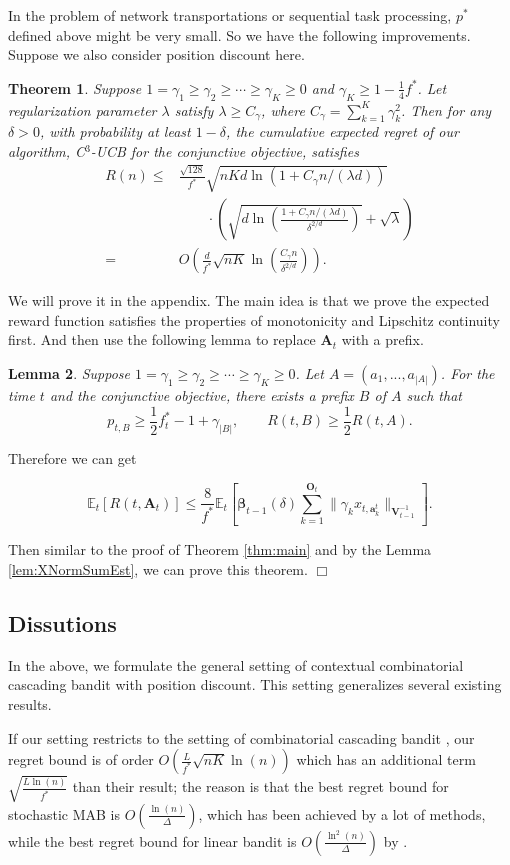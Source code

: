 \documentclass{article}
\newcommand{\bbeta}{\boldsymbol{\beta}}
\newcommand{\EE}{\mathbb{E}}
\newcommand{\bA}{\mathbf{A}}
\newcommand{\ba}{\mathbf{a}}
\newcommand{\bO}{\mathbf{O}}
\newcommand{\bV}{\mathbf{V}}
\newcommand{\abs}[1]{\left| #1 \right|}
\newcommand{\norm}[1]{\| #1 \|}
\newtheorem{theorem}{Theorem}[section]
\newtheorem{lemma}[theorem]{Lemma}%
\newenvironment{proof}{\noindent {\textbf{Proof. }}}{$\Box$ \medskip}
\newcommand{\CLemmaPrefixExi}{
	Suppose $1 = \gamma_1 \geq \gamma_2 \geq \cdots \geq \gamma_K \geq 0$. Let $A = (a_1, ..., a_{\abs{A}})$. For the time $t$ and the conjunctive objective, there exists a prefix $B$ of $A$ such that 
	$$
	p_{t, B} \geq \frac{1}{2}f_{t}^{\ast} - 1 + \gamma_{\abs{B}}, \qquad R(t, B) \geq \frac{1}{2} R(t, A).
	$$ 
}
\newcommand{\CEqDeltaEstAnd}{
	$$
	\EE_t [R(t, \bA_t) ] \leq \frac{8}{f^{\ast}} \EE_t \left[ \bbeta_{t-1}(\delta)\sum_{k=1}^{\bO_t}\norm{\gamma_k x_{t,\ba_k^t}}_{\bV_{t-1}^{-1}} \right].
	$$
}
\begin{document}
In the problem of network transportations or sequential task processing, $p^*$ defined above might be very small. So we have the following improvements. Suppose we also consider position discount here.  
\begin{theorem} %
	\label{thm:and}
	Suppose $1 = \gamma_1 \geq \gamma_2 \geq \cdots \geq \gamma_{K} \geq 0$ and $\gamma_K \geq 1 - \frac{1}{4} f^{\ast}$. Let regularization parameter $\lambda$ satisfy $\lambda \geq C_\gamma$, where $C_\gamma = \sum_{k=1}^{K} \gamma_k^2$. Then for any $\delta > 0$, with probability at least $1 - \delta$, the cumulative expected regret of our algorithm, C$^3$-UCB for the conjunctive objective, satisfies
	\begin{align}
		R(n) \le& \frac{\sqrt{128}}{f^{\ast}} \sqrt{nKd\ln(1 + C_\gamma n/(\lambda d))} \nonumber \\
		&\qquad \cdot \left(\sqrt{d\ln \left( \frac{1 + C_\gamma n/(\lambda d)}{\delta^{2/d}}\right) } + \sqrt{\lambda}\right) \nonumber \\
		=&O\left(\frac{d}{f^{\ast}}\sqrt{nK} \ln \left(\frac{C_\gamma n}{\delta^{2/d}}\right) \right).
	\end{align}
\end{theorem}
\begin{proof}
	We will prove it in the appendix. The main idea is that we prove the expected reward function satisfies the properties of monotonicity and Lipschitz continuity first. And then use the following lemma to replace $\bA_t$ with a prefix.
	\begin{lemma}
		\CLemmaPrefixExi
	\end{lemma}
	
	Therefore we can get
	\CEqDeltaEstAnd
	
	Then similar to the proof of Theorem \ref{thm:main} and by the Lemma \ref{lem:XNormSumEst}, we can prove this theorem.
\end{proof}


\subsection{Dissutions}

In the above, we formulate the general setting of contextual combinatorial cascading bandit with position discount. This setting generalizes several existing results. 

If our setting restricts to the setting of combinatorial cascading bandit \cite{kveton2015combinatorial}, our regret bound is of order $O\left(\frac{L}{f^*}\sqrt{nK}\ln(n)\right)$ which has an additional term $\sqrt{\frac{L\ln(n)}{f^*}}$ than their result; the reason is that the best regret bound for stochastic MAB is $O(\frac{\ln(n)}{\Delta})$, which has been achieved by a lot of methods, while the best regret bound for linear bandit is $O\left(\frac{\ln^2(n)}{\Delta}\right)$ by \cite{abbasi2011improved}.
\end{document}
